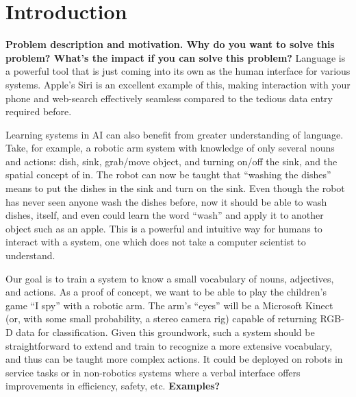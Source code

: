 \documentclass[11pt]{article}
\title{\xxx{Linguistic Classification of Objects}}
\author{Rob Goeddel \and Lauren Hinkle \and James Kirk \and Aaron Mininger}
\date{}
\newcommand{\xxx}[1]{{\bf \color{red} #1}}
\begin{document}
\maketitle

\begin{abstract}
\xxx{Abstract goes here, 1 par. max}
Dijkstra was a cool guy and it's fun to cite his papers~\cite{dijkstra1959}.
\end{abstract}

\section{Introduction}
\xxx{Problem description and motivation. Why do you want to solve this
    problem? What's the impact if you can solve this problem?}
Language is a powerful tool that is just coming into its own as the human
interface for various systems. Apple's Siri is an excellent example of this,
making interaction with your phone and web-search effectively seamless
compared to the tedious data entry required before.

Learning systems in AI can also benefit from greater understanding of
language. Take, for example, a robotic arm system with knowledge of only
several nouns and actions: dish, sink, grab/move object, and turning on/off
the sink, and the spatial concept of in. The robot can now be taught that
``washing the dishes'' means to put the dishes in the sink and turn on the
sink. Even though the robot has never seen anyone wash the dishes before, now
it should be able to wash dishes, itself, and even could learn the word
``wash'' and apply it to another object such as an apple. This is a powerful
and intuitive way for humans to interact with a system, one which does not
take a computer scientist to understand.

Our goal is to train a system to know a small vocabulary of nouns, adjectives,
and actions. As a proof of concept, we want to be able to play the children's
game ``I spy'' with a robotic arm. The arm's ``eyes'' will be a Microsoft
Kinect (or, with some small probability, a stereo camera rig) capable of
returning RGB-D data for classification. Given this groundwork, such a system
should be straightforward to extend and train to recognize a more extensive
vocabulary, and thus can be taught more complex actions. It could be deployed
on robots in service tasks or in non-robotics systems where a verbal interface
offers improvements in efficiency, safety, etc. \xxx{Examples?}
\end{document}
